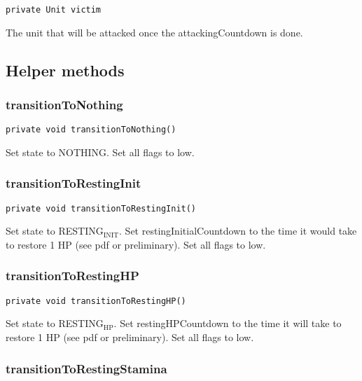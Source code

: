 \documentclass[11pt]{article}
\begin{document}
\begin{verbatim}
private Unit victim
\end{verbatim}

The unit that will be attacked once the attackingCountdown is done.


\subsection{Helper methods}
\label{sec-7-3}

\subsubsection{transitionToNothing}
\label{sec-7-3-1}

\begin{verbatim}
private void transitionToNothing()
\end{verbatim}

Set state to NOTHING. Set all flags to low.


\subsubsection{transitionToRestingInit}
\label{sec-7-3-2}

\begin{verbatim}
private void transitionToRestingInit()
\end{verbatim}

Set state to RESTING$_{\text{INIT}}$. Set restingInitialCountdown to the time it would take
to restore 1 HP (see pdf or preliminary). Set all flags to low.


\subsubsection{transitionToRestingHP}
\label{sec-7-3-3}

\begin{verbatim}
private void transitionToRestingHP()
\end{verbatim}

Set state to RESTING$_{\text{HP}}$. Set restingHPCountdown to the time it will take to
restore 1 HP (see pdf or preliminary). Set all flags to low.


\subsubsection{transitionToRestingStamina}
\label{sec-7-3-4}
\end{document}
